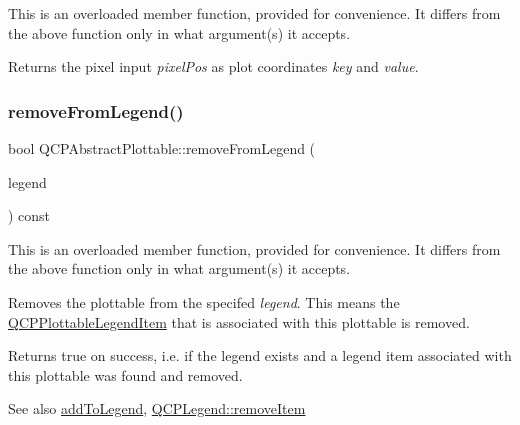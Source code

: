 This is an overloaded member function, provided for convenience. It differs from the above function only in what argument(s) it accepts.

Returns the pixel input {\itshape pixel\+Pos} as plot coordinates {\itshape key} and {\itshape value}. \mbox{\label{class_q_c_p_abstract_plottable_a3cc235007e2343a65ad4f463767e0e20}} 
\subsubsection{\texorpdfstring{remove\+From\+Legend()}{removeFromLegend()}\hspace{0.1cm}{\footnotesize\ttfamily [1/2]}}
{\footnotesize\ttfamily bool Q\+C\+P\+Abstract\+Plottable\+::remove\+From\+Legend (\begin{DoxyParamCaption}\item[{\hyperlink{class_q_c_p_legend}{Q\+C\+P\+Legend} $\ast$}]{legend }\end{DoxyParamCaption}) const}

This is an overloaded member function, provided for convenience. It differs from the above function only in what argument(s) it accepts.

Removes the plottable from the specifed {\itshape legend}. This means the \hyperlink{class_q_c_p_plottable_legend_item}{Q\+C\+P\+Plottable\+Legend\+Item} that is associated with this plottable is removed.

Returns true on success, i.\+e. if the legend exists and a legend item associated with this plottable was found and removed.

\begin{DoxySeeAlso}{See also}
\hyperlink{class_q_c_p_abstract_plottable_aa64e93cb5b606d8110d2cc0a349bb30f}{add\+To\+Legend}, \hyperlink{class_q_c_p_legend_ac91595c3eaa746fe6321d2eb952c63bb}{Q\+C\+P\+Legend\+::remove\+Item} 
\end{DoxySeeAlso}
\mbox{\label{class_q_c_p_abstract_plottable_ac95fb2604d9106d0852ad9ceb326fe8c}} 
